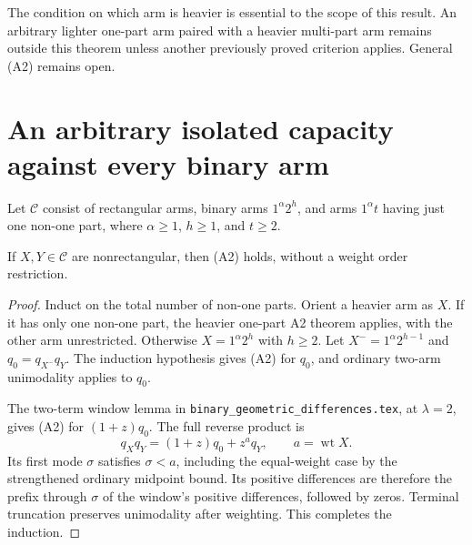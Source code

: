 The condition on which arm is heavier is essential to the scope
of this result. An arbitrary lighter one-part arm paired with a
heavier multi-part arm remains outside this theorem unless another
previously proved criterion applies. General (A2) remains open.

\section{An arbitrary isolated capacity against every binary arm}
Let $\mathcal C$ consist of rectangular arms, binary arms
$1^\alpha2^h$, and arms $1^\alpha t$ having just one non-one
part, where $\alpha\ge1$, $h\ge1$, and $t\ge2$.

\begin{proposition}
If $X,Y\in\mathcal C$ are nonrectangular, then (A2) holds,
without a weight order restriction.
\end{proposition}
\begin{proof}
Induct on the total number of non-one parts. Orient a heavier
arm as $X$. If it has only one non-one part, the heavier
one-part A2 theorem applies, with the other arm unrestricted.
Otherwise $X=1^\alpha2^h$ with $h\ge2$.
Let $X^-=1^\alpha2^{h-1}$ and $q_0=q_{X^-}q_Y$.
The induction hypothesis gives (A2) for $q_0$, and ordinary
two-arm unimodality applies to $q_0$.

The two-term window lemma in
\texttt{binary\_geometric\_differences.tex}, at $\lambda=2$,
gives (A2) for $(1+z)q_0$. The full reverse product is
\[
 q_Xq_Y=(1+z)q_0+z^a q_Y,\qquad a=\operatorname{wt}X.
\]
Its first mode $\sigma$ satisfies $\sigma<a$, including the
equal-weight case by the strengthened ordinary midpoint bound.
Its positive differences are therefore the prefix through
$\sigma$ of the window's positive differences, followed by zeros.
Terminal truncation preserves unimodality after weighting.
This completes the induction.
\end{proof}

